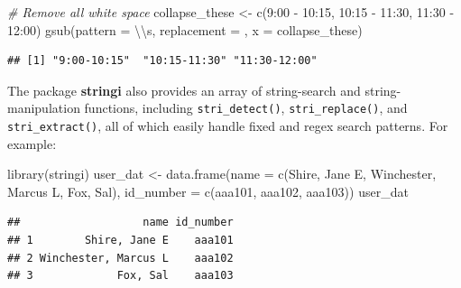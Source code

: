 \documentclass[
]{book}
\newenvironment{Shaded}{\begin{snugshade}}{\end{snugshade}}
\newcommand{\AttributeTok}[1]{\textcolor[rgb]{0.77,0.63,0.00}{#1}}
\newcommand{\CommentTok}[1]{\textcolor[rgb]{0.56,0.35,0.01}{\textit{#1}}}
\newcommand{\FunctionTok}[1]{\textcolor[rgb]{0.00,0.00,0.00}{#1}}
\newcommand{\NormalTok}[1]{#1}
\newcommand{\OtherTok}[1]{\textcolor[rgb]{0.56,0.35,0.01}{#1}}
\newcommand{\SpecialCharTok}[1]{\textcolor[rgb]{0.00,0.00,0.00}{#1}}
\newcommand{\StringTok}[1]{\textcolor[rgb]{0.31,0.60,0.02}{#1}}
\begin{document}
\begin{Shaded}
\begin{Highlighting}[]
\CommentTok{\# Remove all white space}
\NormalTok{collapse\_these }\OtherTok{\textless{}{-}} \FunctionTok{c}\NormalTok{(}\StringTok{\textquotesingle{}9:00 {-} 10:15\textquotesingle{}}\NormalTok{, }\StringTok{\textquotesingle{}10:15 {-} 11:30\textquotesingle{}}\NormalTok{, }\StringTok{\textquotesingle{}11:30 {-} 12:00\textquotesingle{}}\NormalTok{)}
\FunctionTok{gsub}\NormalTok{(}\AttributeTok{pattern =} \StringTok{\textquotesingle{}}\SpecialCharTok{\textbackslash{}\textbackslash{}}\StringTok{s\textquotesingle{}}\NormalTok{, }\AttributeTok{replacement =} \StringTok{\textquotesingle{}\textquotesingle{}}\NormalTok{, }\AttributeTok{x =}\NormalTok{ collapse\_these)}
\end{Highlighting}
\end{Shaded}

\begin{verbatim}
## [1] "9:00-10:15"  "10:15-11:30" "11:30-12:00"
\end{verbatim}

The package \textbf{stringi} also provides an array of string-search and string-manipulation functions, including \texttt{stri\_detect()}, \texttt{stri\_replace()}, and \texttt{stri\_extract()}, all of which easily handle fixed and regex search patterns. For example:

\begin{Shaded}
\begin{Highlighting}[]
\FunctionTok{library}\NormalTok{(stringi)}
\NormalTok{user\_dat }\OtherTok{\textless{}{-}} \FunctionTok{data.frame}\NormalTok{(}\AttributeTok{name =} \FunctionTok{c}\NormalTok{(}\StringTok{\textquotesingle{}Shire, Jane E\textquotesingle{}}\NormalTok{, }\StringTok{\textquotesingle{}Winchester, Marcus L\textquotesingle{}}\NormalTok{, }\StringTok{\textquotesingle{}Fox, Sal\textquotesingle{}}\NormalTok{), }\AttributeTok{id\_number =} \FunctionTok{c}\NormalTok{(}\StringTok{\textquotesingle{}aaa101\textquotesingle{}}\NormalTok{, }\StringTok{\textquotesingle{}aaa102\textquotesingle{}}\NormalTok{, }\StringTok{\textquotesingle{}aaa103\textquotesingle{}}\NormalTok{))}
\NormalTok{user\_dat}
\end{Highlighting}
\end{Shaded}

\begin{verbatim}
##                   name id_number
## 1        Shire, Jane E    aaa101
## 2 Winchester, Marcus L    aaa102
## 3             Fox, Sal    aaa103
\end{verbatim}
\end{document}
